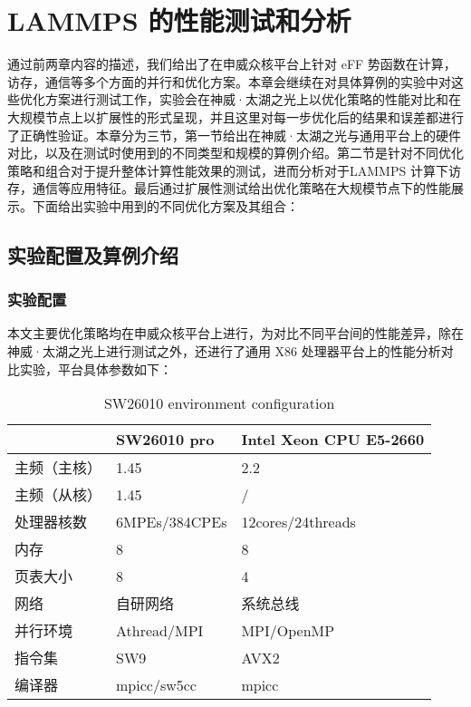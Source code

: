 
\chapter{LAMMPS 的性能测试和分析}
通过前两章内容的描述，我们给出了在申威众核平台上针对 eFF 势函数在计算，访存，通信等多个方面的并行和优化方案。本章会继续在对具体算例的实验中对这些优化方案进行测试工作，实验会在神威·太湖之光上以优化策略的性能对比和在大规模节点上以扩展性的形式呈现，并且这里对每一步优化后的结果和误差都进行了正确性验证。本章分为三节，第一节给出在神威·太湖之光与通用平台上的硬件对比，以及在测试时使用到的不同类型和规模的算例介绍。第二节是针对不同优化策略和组合对于提升整体计算性能效果的测试，进而分析对于LAMMPS 计算下访存，通信等应用特征。最后通过扩展性测试给出优化策略在大规模节点下的性能展示。下面给出实验中用到的不同优化方案及其组合：

\section{实验配置及算例介绍}
\subsection{实验配置}
本文主要优化策略均在申威众核平台上进行，为对比不同平台间的性能差异，除在神威·太湖之光上进行测试之外，还进行了通用 X86 处理器平台上的性能分析对比实验，平台具体参数如下：

\begin{table}[]
     \centering
     \caption{SW26010 environment configuration}
       \renewcommand{\arraystretch}{1.5}
\begin{tabular}{lll}
\hline
       & SW26010 pro  & Intel Xeon CPU E5-2660 \\ \hline
主频（主核） & 1.45        & 2.2                    \\
主频（从核） & 1.45        & /                      \\
处理器核数 & 6MPEs/384CPEs & 12cores/24threads \\
内存     & 8           & 8                      \\
页表大小   & 8           & 4                      \\
网络 & 自研网络 & 系统总线 \\
并行环境 & Athread/MPI & MPI/OpenMP \\
指令集 & SW9 & AVX2 \\
编译器    & mpicc/sw5cc & mpicc                  \\ \hline
\end{tabular}
\end{table}


